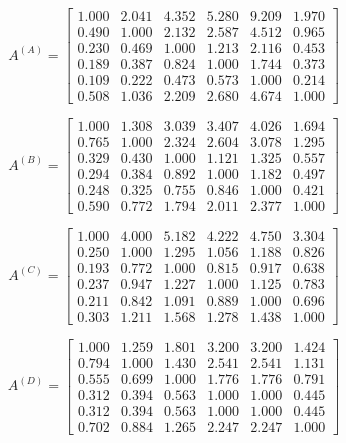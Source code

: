 \documentclass[twoside]{CUGThesis}
\begin{document}
\begin{equation}
A^{(A)} = \begin{bmatrix}
1.000 & 2.041 & 4.352 & 5.280 & 9.209 & 1.970 \\
0.490 & 1.000 & 2.132 & 2.587 & 4.512 & 0.965 \\
0.230 & 0.469 & 1.000 & 1.213 & 2.116 & 0.453 \\
0.189 & 0.387 & 0.824 & 1.000 & 1.744 & 0.373 \\
0.109 & 0.222 & 0.473 & 0.573 & 1.000 & 0.214 \\
0.508 & 1.036 & 2.209 & 2.680 & 4.674 & 1.000
\end{bmatrix}
\label{eq:jm_A}
\end{equation}

\begin{equation}
A^{(B)} = \begin{bmatrix}
1.000 & 1.308 & 3.039 & 3.407 & 4.026 & 1.694 \\
0.765 & 1.000 & 2.324 & 2.604 & 3.078 & 1.295 \\
0.329 & 0.430 & 1.000 & 1.121 & 1.325 & 0.557 \\
0.294 & 0.384 & 0.892 & 1.000 & 1.182 & 0.497 \\
0.248 & 0.325 & 0.755 & 0.846 & 1.000 & 0.421 \\
0.590 & 0.772 & 1.794 & 2.011 & 2.377 & 1.000
\end{bmatrix}
\label{eq:jm_B}
\end{equation}

\begin{equation}
A^{(C)} = \begin{bmatrix}
1.000 & 4.000 & 5.182 & 4.222 & 4.750 & 3.304 \\
0.250 & 1.000 & 1.295 & 1.056 & 1.188 & 0.826 \\
0.193 & 0.772 & 1.000 & 0.815 & 0.917 & 0.638 \\
0.237 & 0.947 & 1.227 & 1.000 & 1.125 & 0.783 \\
0.211 & 0.842 & 1.091 & 0.889 & 1.000 & 0.696 \\
0.303 & 1.211 & 1.568 & 1.278 & 1.438 & 1.000
\end{bmatrix}
\label{eq:jm_C}
\end{equation}

\begin{equation}
A^{(D)} = \begin{bmatrix}
1.000 & 1.259 & 1.801 & 3.200 & 3.200 & 1.424 \\
0.794 & 1.000 & 1.430 & 2.541 & 2.541 & 1.131 \\
0.555 & 0.699 & 1.000 & 1.776 & 1.776 & 0.791 \\
0.312 & 0.394 & 0.563 & 1.000 & 1.000 & 0.445 \\
0.312 & 0.394 & 0.563 & 1.000 & 1.000 & 0.445 \\
0.702 & 0.884 & 1.265 & 2.247 & 2.247 & 1.000
\end{bmatrix}
\label{eq:jm_D}
\end{equation}
\end{document}
